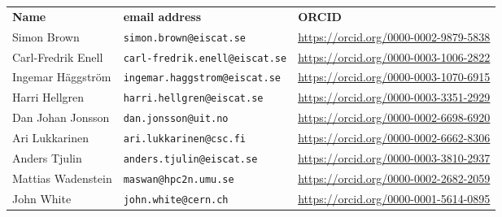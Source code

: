 \centering
\begin{tabular}{lll}
{\bf Name} & {\bf email address} & {\bf ORCID} \\
Simon Brown & {\tt simon.brown@eiscat.se} & \url{https://orcid.org/0000-0002-9879-5838} \\
Carl-Fredrik Enell & {\tt carl-fredrik.enell@eiscat.se} & \url{https://orcid.org/0000-0003-1006-2822}\\
Ingemar H\"{a}ggstr\"{o}m & {\tt ingemar.haggstrom@eiscat.se} & \url{https://orcid.org/0000-0003-1070-6915} \\
Harri Hellgren & {\tt harri.hellgren@eiscat.se} & \url{https://orcid.org/0000-0003-3351-2929}\\
Dan Johan Jonsson & {\tt dan.jonsson@uit.no} & \url{https://orcid.org/0000-0002-6698-6920}\\
Ari Lukkarinen & {\tt ari.lukkarinen@csc.fi} & \url{https://orcid.org/0000-0002-6662-8306}\\
Anders Tjulin & {\tt anders.tjulin@eiscat.se} & \url{https://orcid.org/0000-0003-3810-2937} \\
Mattias Wadenstein & {\tt maswan@hpc2n.umu.se} & \url{https://orcid.org/0000-0002-2682-2059} \\
John White & {\tt john.white@cern.ch} & \url{https://orcid.org/0000-0001-5614-0895} \\
\end{tabular}
